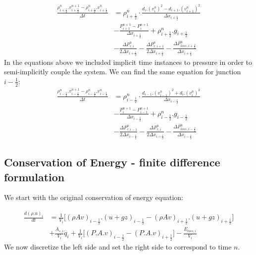 \documentclass[11pt,letterpaper,titlepage]{article}
\newcommand{\half}{\frac{1}{2}}
\begin{document}
\begin{equation}
\begin{aligned}
\frac{\rho_{i+\half}^{n}.v_{i+\half}^{n+1}-\rho_{i+\half}^n.v_{i+\half}^n}{\Delta t} &= \rho_{i+\half}^n\cdot\frac{d_i.(v_{i}^n)^2-d_{i+1}.(v_{i+1}^n)^2}{\Delta x_{i+\half}}     \\
&-\frac{P_{i+1}^{n+1}-P_i^{n+1}}{\Delta x_{i+\half}} +\rho_{i+\half}^n.g_{i+\half} \\
&-\frac{\Delta P_{\tau,i}^n }{2\Delta x_{i+\half}}- \frac{\Delta P_{\tau,i+1}^n }{2\Delta x_{i+\half}} -\frac{\Delta P_{loss,i+\half}^n}{\Delta x_{i+\half}}
\end{aligned}
\end{equation}
\newline
\noindent In the equations above we included implicit time instances to pressure in order to semi-implicitly couple the system.
\newline
\newline
We can find the same equation for junction $i-\half$:
\begin{equation}
\begin{aligned}
\frac{\rho_{i-\half}^{n}.v_{i-\half}^{n+1}-\rho_{i-\half}^n.v_{i-\half}^n}{\Delta t} &= \rho_{i-\half}^n\cdot\frac{d_{i-1}.(v_{i-1}^n)^2+d_{i}.(v_{i}^n)^2}{\Delta x_{i-\half}}     \\
&-\frac{P_{i}^{n+1}-P_{i-1}^{n+1}}{\Delta x_{i-\half}} +\rho_{i-\half}^n.g_{i-\half} \\
&-\frac{\Delta P_{\tau,i-1}^n }{2\Delta x_{i-\half}}- \frac{\Delta P_{\tau,i}^n }{2\Delta x_{i-\half}} -\frac{\Delta P_{loss,i-\half}^n}{\Delta x_{i-\half}}
\end{aligned}
\end{equation}



\vspace{1cm}
\subsection{Conservation of Energy - finite difference formulation}
We start with the original conservation of energy equation:

\begin{equation*}
\begin{aligned}
\frac{d(\rho.u)_i}{dt} &=\frac{1}{V_i}\biggr[ (\rho Av)_{i-\half}.(u+gz)_{i-\half} - (\rho Av)_{i+\half}.(u+gz)_{i+\half} \biggr] \\
&+\frac{A_{s,i}}{V_i}\dot{q}_i + \frac{1}{V_i}\biggr[   (P.A.v)_{i-\half} - (P.A.v)_{i+\half}   \biggr] - \frac{E_{loss,i}}{V_i}
\end{aligned}
\end{equation*}
\newline
\noindent We now discretize the left side and set the right side to correspond to time $n$.
\end{document}
